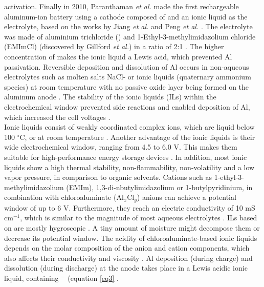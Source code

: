 activation. Finally in 2010, Paranthaman \textit{et al.} made the first rechargeable aluminum-ion battery using a cathode composed of  and an ionic liquid as the electrolyte, based on the works by Jiang \textit{et al.} and Peng \textit{et al.} \cite{paranthaman_transformational_2010-1, jiang_electrodeposition_2006-1,peng_investigation_2008}. The electrolyte was made of aluminium trichloride () and 1-Ethyl-3-methylimidazolium chloride (EMImCl) (discovered by Gillford \textit{et al.}) in a ratio of 2:1 \cite{gifford_aluminum/chlorine_1988-1}. The higher concentration of  makes the ionic liquid a Lewis acid, which prevented Al passivation. 
Reversible deposition and dissolution of Al occurs in non-aqueous electrolytes such as molten salts NaCl- or ionic liquids (quaternary ammonium species) at room temperature with no passive oxide layer being formed on the aluminum anode \cite{vestergaard_molten_1993,galinski_ionic_2006,elia_insights_2017}. The stability of the ionic liquids (ILs) within the electrochemical window prevented side reactions and enabled deposition of Al, which increased the cell voltages \cite{li_aluminum_2002}.\\ Ionic liquids consist of weakly coordinated complex ions, which are liquid below 100 $^{\circ}$C, or at room temperature \cite{hayes}. Another advantage of the ionic liquids is their wide electrochemical window, ranging from 4.5 to 6.0 V. This makes them suitable for high-performance energy storage devices \cite{wang_binder-free_2015}. In addition, most ionic liquids show a high thermal stability, non-flammability, non-volatility and a low vapor pressure, in comparison to organic solvents. Cations such as 1-ethyl-3-methylimidazolium (EMIm), 1,3-di-nbutylimidazolium or 1-butylpyridinium, in combination with chloroaluminate (Al$_x$Cl$_y$) anions can achieve a potential window of up to 6 V. Furthermore, they reach an electric conductivity of 10 mS cm$^{-1}$, which is similar to the magnitude of most aqueous electrolytes \cite{ngo_thermal_2000}. ILs based on  are mostly hygroscopic \cite{ueda_electroplating_2012}. A tiny amount of moisture might decompose them or decrease its potential window. The acidity of chloroaluminate-based ionic liquids depends on the molar composition of the anion and cation components, which also affects their conductivity and viscosity \cite{buzzeo_non-haloaluminate_2004}. 
Al deposition (during charge) and dissolution (during discharge) at the anode takes place in a Lewis acidic ionic liquid, containing $^-$ (equation \ref{eq3} \cite{galinski_ionic_2006}.

